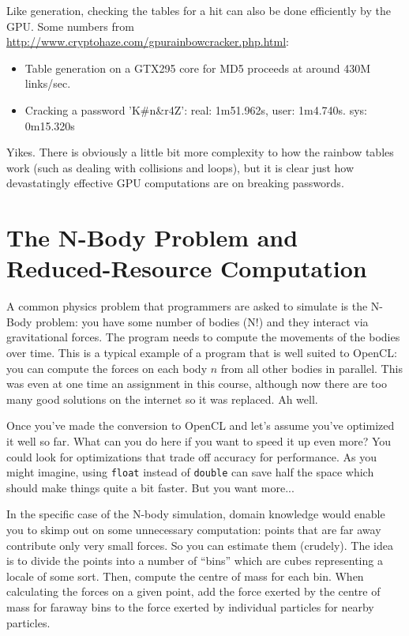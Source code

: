 \documentclass[a4paper]{report}
\begin{document}
Like generation, checking the tables for a hit can also be done efficiently by the GPU. Some numbers from \url{http://www.cryptohaze.com/gpurainbowcracker.php.html}: 
\begin{itemize}
	\item Table generation on a GTX295 core for MD5 proceeds at around 430M links/sec.
	\item Cracking a password 'K\#n\&r4Z': real: 1m51.962s, user: 1m4.740s. sys: 0m15.320s
\end{itemize}

Yikes. There is obviously a little bit more complexity to how the rainbow tables work (such as dealing with collisions and loops), but it is clear just how devastatingly effective GPU computations are on breaking passwords.

\section*{The N-Body Problem and Reduced-Resource Computation}
A common physics problem that programmers are asked to simulate is the N-Body problem: you have some number of bodies (N!) and they interact via gravitational forces. The program needs to compute the movements of the bodies over time. This is a typical example of a program that is well suited to OpenCL: you can compute the forces on each body $n$ from all other bodies in parallel. This was even at one time an assignment in this course, although now there are too many good solutions on the internet so it was replaced. Ah well.

Once you've made the conversion to OpenCL and let's assume you've optimized it well so far. What can you do here if you want to speed it up even more? You could look for optimizations that trade off accuracy for performance. As you might imagine, using \texttt{float} instead of \texttt{double} can save half the space which should make things quite a bit faster. But you want more...

In the specific case of the N-body simulation,
domain knowledge would enable you to skimp out on
some unnecessary computation: points that are far away contribute only
very small forces. So you can estimate them (crudely). The idea is to divide the points into a number of ``bins'' which are cubes representing a locale of some sort. Then, compute the centre of mass for each bin. When calculating the forces on a given point, add the force exerted by the centre of mass for faraway bins to the force exerted by individual particles for nearby particles.
\end{document}
